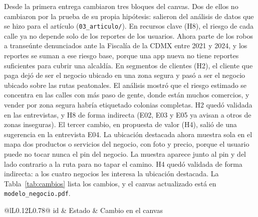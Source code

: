 \documentclass[11pt]{article}
\begin{document}
Desde la primera entrega cambiaron tres bloques del canvas. Dos de ellos no cambiaron por la prueba
de su propia hipótesis: salieron del análisis de datos que se hizo para el artículo
(\texttt{03\_articulo/}). En recursos clave (H8), el riesgo de cada calle ya no depende solo de
los reportes de los usuarios. Ahora parte de los robos a transeúnte denunciados ante la Fiscalía de
la CDMX entre 2021 y 2024, y los reportes se suman a ese riesgo base, porque una app nueva no tiene
reportes suficientes para cubrir una alcaldía. En segmentos de clientes (H2), el cliente que paga
dejó de ser el negocio ubicado en una zona segura y pasó a ser el negocio ubicado sobre las rutas
peatonales. El análisis mostró que el riesgo estimado se concentra en las calles con más paso de
gente, donde están muchos comercios, y vender por zona segura habría etiquetado colonias
completas. H2 quedó validada en las entrevistas, y H8 de forma
indirecta (E02, E03 y E05 ya avisan a otros de zonas inseguras). El tercer cambio,
en propuesta de valor (H4), salió de una sugerencia en la entrevista E04. La ubicación destacada ahora muestra sola en el mapa dos productos
o servicios del negocio, con foto y precio, porque el usuario puede no tocar nunca el pin del
negocio. La muestra aparece junto al pin y del lado contrario a la ruta para no tapar el camino.
H4 quedó validada de forma indirecta: a los cuatro negocios les interesa la ubicación destacada. La Tabla~\ref{tab:cambios} lista los
cambios, y el canvas actualizado está en \texttt{modelo\_negocio.pdf}.

\begin{table}[H]
  \caption{Cambios en el canvas y la hipótesis que los provocó.}
  \label{tab:cambios}
  \footnotesize
  \renewcommand{\arraystretch}{1.2}
  \begin{tabular}{@{}lL{0.12\textwidth}L{0.78\textwidth}@{}}
    \toprule
    id & Estado & Cambio en el canvas \\
    \midrule
    \\
    \bottomrule
  \end{tabular}
\end{table}

\clearpage
\appendix
\end{document}
